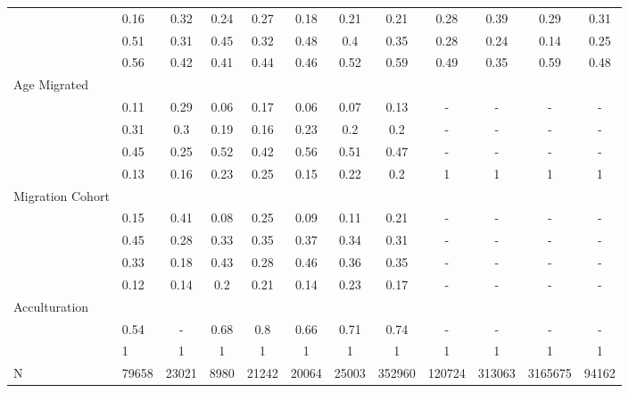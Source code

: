 \begin{table}[ht]
\begin{tabular}{>{\raggedright\arraybackslash}p{3.2cm}|lcccccc|cccc}
  \multicolumn{1}{>{\raggedleft\arraybackslash}p{2.2cm}|}{\makebox[2.2cm][r]{Lives Alone }}& 0.16 & 0.32 & 0.24 & 0.27 & 0.18 & 0.21 & 0.21 & 0.28 & 0.39 & 0.29 & 0.31 \\ 
  \multicolumn{1}{>{\raggedleft\arraybackslash}p{2.9cm}|}{\makebox[2.9cm][r]{Lives with Child }}& 0.51 & 0.31 & 0.45 & 0.32 & 0.48 & 0.4 & 0.35 & 0.28 & 0.24 & 0.14 & 0.25 \\ 
  \multicolumn{1}{>{\raggedleft\arraybackslash}p{3.4cm}|}{\makebox[3.4cm][r]{Married/Cohabiting }}& 0.56 & 0.42 & 0.41 & 0.44 & 0.46 & 0.52 & 0.59 & 0.49 & 0.35 & 0.59 & 0.48 \\ 
  Age Migrated &  &  &  &  &  &  &  &  &  &  &  \\ 
  \multicolumn{1}{>{\raggedleft\arraybackslash}p{2.4cm}|}{\makebox[2.4cm][r]{Less than 15 }}& 0.11 & 0.29 & 0.06 & 0.17 & 0.06 & 0.07 & 0.13 & - & - & - & - \\ 
  \multicolumn{1}{>{\raggedleft\arraybackslash}p{1.6cm}|}{\makebox[1.6cm][r]{15 - 23 }}& 0.31 & 0.3 & 0.19 & 0.16 & 0.23 & 0.2 & 0.2 & - & - & - & - \\ 
  \multicolumn{1}{>{\raggedleft\arraybackslash}p{1.6cm}|}{\makebox[1.6cm][r]{24 - 49 }}& 0.45 & 0.25 & 0.52 & 0.42 & 0.56 & 0.51 & 0.47 & - & - & - & - \\ 
  \multicolumn{1}{>{\raggedleft\arraybackslash}p{2.6cm}|}{\makebox[2.6cm][r]{50 and Above }}& 0.13 & 0.16 & 0.23 & 0.25 & 0.15 & 0.22 & 0.2 & 1 & 1 & 1 & 1 \\ 
  Migration Cohort &  &  &  &  &  &  &  &  &  &  &  \\ 
  \multicolumn{1}{>{\raggedleft\arraybackslash}p{2.3cm}|}{\makebox[2.3cm][r]{Before 1965 }}& 0.15 & 0.41 & 0.08 & 0.25 & 0.09 & 0.11 & 0.21 & - & - & - & - \\ 
  \multicolumn{1}{>{\raggedleft\arraybackslash}p{2.2cm}|}{\makebox[2.2cm][r]{1965 - 1979 }}& 0.45 & 0.28 & 0.33 & 0.35 & 0.37 & 0.34 & 0.31 & - & - & - & - \\ 
  \multicolumn{1}{>{\raggedleft\arraybackslash}p{2.2cm}|}{\makebox[2.2cm][r]{1980 - 1999 }}& 0.33 & 0.18 & 0.43 & 0.28 & 0.46 & 0.36 & 0.35 & - & - & - & - \\ 
  \multicolumn{1}{>{\raggedleft\arraybackslash}p{2.1cm}|}{\makebox[2.1cm][r]{After 1999 }}& 0.12 & 0.14 & 0.2 & 0.21 & 0.14 & 0.23 & 0.17 & - & - & - & - \\ 
  Acculturation &  &  &  &  &  &  &  &  &  &  &  \\ 
  \multicolumn{1}{>{\raggedleft\arraybackslash}p{1.6cm}|}{\makebox[1.6cm][r]{Citizen }}& 0.54 & - & 0.68 & 0.8 & 0.66 & 0.71 & 0.74 & - & - & - & - \\ 
  \multicolumn{1}{>{\raggedleft\arraybackslash}p{3cm}|}{\makebox[3cm][r]{English Speakers }}& 1 & 1 & 1 & 1 & 1 & 1 & 1 & 1 & 1 & 1 & 1 \\ 
  N & 79658 & 23021 & 8980 & 21242 & 20064 & 25003 & 352960 & 120724 & 313063 & 3165675 & 94162 \\ 
   \hline
\end{tabular}
\endgroup
\end{table}
